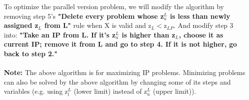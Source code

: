 To optimize the parallel version problem, we will modify the algorithm by removing step 5’s \textbf{"Delete every problem whose z$_u^L$ is less than newly assigned z$_L$ from L"} rule when X is valid and z$_L<$z$_{LP}$. And modify step 3 into: \textbf{"Take an IP from L. If it's z$_u^L$ is higher than z$_L$, choose it as current IP; remove it from L and go to step 4. If it is not higher, go back to step 2."}\\
\\
\textbf{Note:} The above algorithm is for maximizing IP problems. Minimizing problems can also be solved by the above algorithm by changing some of its steps and variables (e.g. using z$_l^L$ (lower limit) instead of z$_u^L$ (upper limit)).
